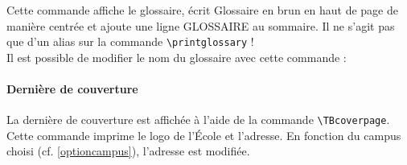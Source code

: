 Cette commande affiche le glossaire, écrit \og Glossaire \fg{} en brun en haut de page de manière centrée et ajoute une ligne \og GLOSSAIRE \fg{} au sommaire. Il ne s'agit pas que d'un alias sur la commande \verb!\printglossary! !\\

Il est possible de modifier le nom du glossaire avec cette commande :
\begin{latex}
	\renewcommand{\TBglossaryname}{Mon glossaire}
\end{latex}

\paragraph{Dernière de couverture}

La dernière de couverture est affichée à l'aide de la commande \verb!\TBcoverpage!. Cette commande imprime le logo de l'École et l'adresse. En fonction du campus choisi (cf. \ref{optioncampus}), l'adresse est modifiée.
